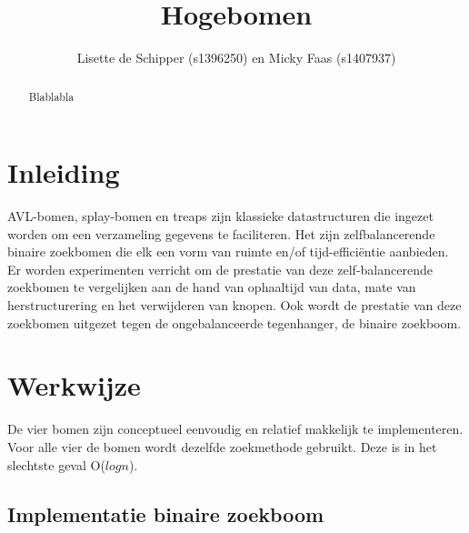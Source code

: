\documentclass[a4paper,10pt]{article}
\title{ Hogebomen }
\author{ Lisette de Schipper (s1396250) en Micky Faas (s1407937) }
\date{}
\begin{document}
\maketitle

\begin{abstract}
Blablabla
\end{abstract}

\section{Inleiding}
AVL-bomen, splay-bomen en treaps zijn klassieke datastructuren die ingezet worden om een verzameling gegevens te faciliteren. Het zijn zelfbalancerende binaire zoekbomen die elk een vorm van ruimte en/of tijd-effici\"entie aanbieden. Er worden experimenten verricht om de prestatie van deze zelf-balancerende zoekbomen te vergelijken aan de hand van ophaaltijd van data, mate van herstructurering en het verwijderen van knopen. Ook wordt de prestatie van deze zoekbomen uitgezet tegen de ongebalanceerde tegenhanger, de binaire zoekboom.

\section{Werkwijze}
De vier bomen zijn conceptueel eenvoudig en relatief makkelijk te implementeren. Voor alle vier de bomen wordt dezelfde zoekmethode gebruikt. Deze is in het slechtste geval O($logn$).
\subsection{Implementatie binaire zoekboom}
\end{document}
